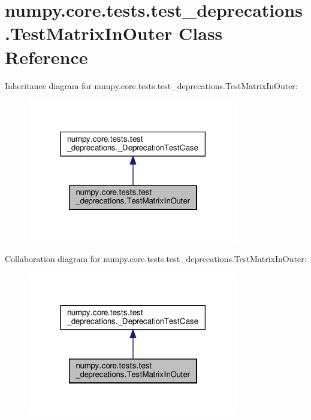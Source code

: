 \hypertarget{classnumpy_1_1core_1_1tests_1_1test__deprecations_1_1TestMatrixInOuter}{}\section{numpy.\+core.\+tests.\+test\+\_\+deprecations.\+Test\+Matrix\+In\+Outer Class Reference}
\label{classnumpy_1_1core_1_1tests_1_1test__deprecations_1_1TestMatrixInOuter}


Inheritance diagram for numpy.\+core.\+tests.\+test\+\_\+deprecations.\+Test\+Matrix\+In\+Outer\+:
\nopagebreak
\begin{figure}[H]
\begin{center}
\leavevmode
\includegraphics[width=261pt]{classnumpy_1_1core_1_1tests_1_1test__deprecations_1_1TestMatrixInOuter__inherit__graph}
\end{center}
\end{figure}


Collaboration diagram for numpy.\+core.\+tests.\+test\+\_\+deprecations.\+Test\+Matrix\+In\+Outer\+:
\nopagebreak
\begin{figure}[H]
\begin{center}
\leavevmode
\includegraphics[width=261pt]{classnumpy_1_1core_1_1tests_1_1test__deprecations_1_1TestMatrixInOuter__coll__graph}
\end{center}
\end{figure}
